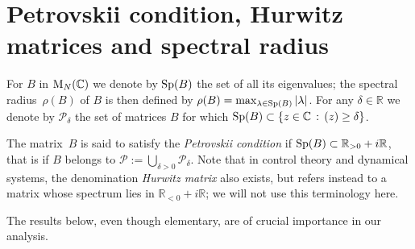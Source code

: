 \documentclass[10pt]{amsart}
\let\Re\relax
\DeclareMathOperator{\Re}{Re}
\theoremstyle{definition}
\newcommand\R{\mathbb{R}}
\begin{document}
\section{Petrovskii condition, Hurwitz matrices and spectral radius}\label{appendix:petrovskii}

For $B$ in $\textnormal{M}_N(\mathbb{C})$ we denote by $\textnormal{Sp}(B)$ the set of all its eigenvalues; the spectral radius~$\rho(B)$ of $B$ is then defined by $\rho(B) = \max_{\lambda\in \textnormal{Sp}(B)} |\lambda|$. For any $\delta\in\R$ we denote by $\mathscr{P}_{\delta}$ the set of matrices $B$ for which $\textnormal{Sp}(B)\subset\{z\in\mathbb{C}\,:\,\Re(z)\geq \delta\}$.

The matrix~$B$ is said to satisfy the \emph{Petrovskii condition} if $\textnormal{Sp}(B)\subset \R_{>0}+i\R$, that is if $B$ belongs to $\mathscr{P}:=\bigcup_{\delta>0} \mathscr{P}_\delta$. Note that in control theory and dynamical systems, the denomination \emph{Hurwitz matrix} also exists, but refers instead to a matrix whose spectrum lies in $\R_{<0}+i\R$; we will not use this terminology here.

The results below, even though elementary, are of crucial importance in our analysis.
\end{document}
